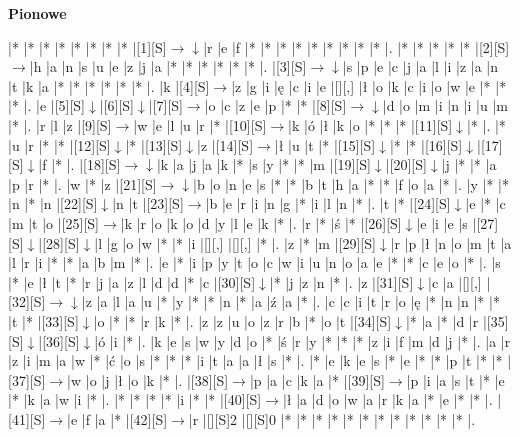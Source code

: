 \documentclass[11pt]{article}
\newcommand\drarr{$\rightarrow \!\!\!\!\! \downarrow$}
\newcommand\rarr{$\rightarrow$}
\newcommand\darr{$\downarrow$}
\begin{document}
\begin{PuzzleClues}{\textbf{Pionowe}\\}
\end{PuzzleClues}\newpage%

\noindent\begin{Puzzle}{20}{23}|*	|*	|*	|*	|*	|*	|*	|*	|[1][S]\drarr	|r	|e	|f	|*	|*	|*	|*	|*	|*	|*	|*	|*	|.
|*	|*	|*	|*	|*	|[2][S]\rarr	|h	|a	|n	|s	|u	|e	|z	|j	|a	|*	|*	|*	|*	|*	|*	|.
|[3][S]\drarr	|s	|p	|e	|c	|j	|a	|l	|i	|z	|a	|n	|t	|k	|a	|*	|*	|*	|*	|*	|*	|.
|k	|[4][S]\rarr	|z	|g	|i	|ę	|c	|i	|e	|[][,]{ }	|ł	|o	|k	|c	|i	|o	|w	|e	|*	|*	|*	|.
|e	|[5][S]\darr	|[6][S]\darr	|[7][S]\rarr	|o	|c	|z	|e	|p	|*	|*	|[8][S]\drarr	|d	|o	|m	|i	|n	|i	|u	|m	|*	|.
|r	|l	|z	|[9][S]\rarr	|w	|e	|l	|u	|r	|*	|[10][S]\rarr	|k	|ó	|ł	|k	|o	|*	|*	|*	|[11][S]\darr	|*	|.
|*	|u	|r	|*	|*	|[12][S]\darr	|*	|[13][S]\darr	|z	|[14][S]\rarr	|ł	|u	|t	|*	|[15][S]\darr	|*	|*	|[16][S]\darr	|[17][S]\darr	|f	|*	|.
|[18][S]\drarr	|k	|a	|j	|a	|k	|*	|s	|y	|*	|*	|m	|[19][S]\darr	|[20][S]\darr	|j	|*	|*	|a	|p	|r	|*	|.
|w	|*	|z	|[21][S]\drarr	|b	|o	|n	|e	|s	|*	|*	|b	|t	|h	|a	|*	|*	|f	|o	|a	|*	|.
|y	|*	|*	|n	|*	|n	|[22][S]\darr	|n	|t	|[23][S]\rarr	|b	|e	|r	|i	|n	|g	|*	|i	|l	|n	|*	|.
|t	|*	|[24][S]\darr	|e	|*	|c	|m	|t	|o	|[25][S]\rarr	|k	|r	|o	|k	|o	|d	|y	|l	|e	|k	|*	|.
|r	|*	|ś	|*	|[26][S]\darr	|e	|i	|e	|s	|[27][S]\darr	|[28][S]\darr	|l	|g	|o	|w	|*	|*	|i	|[][,]{ }	|[][,]{ }	|*	|.
|z	|*	|m	|[29][S]\darr	|r	|p	|ł	|n	|o	|m	|t	|a	|l	|r	|i	|*	|*	|a	|b	|m	|*	|.
|e	|*	|i	|p	|y	|t	|o	|c	|w	|i	|u	|n	|o	|a	|e	|*	|*	|c	|e	|o	|*	|.
|s	|*	|e	|ł	|t	|*	|r	|j	|a	|z	|l	|d	|d	|*	|c	|[30][S]\darr	|*	|j	|z	|n	|*	|.
|z	|[31][S]\darr	|c	|a	|[][,]{ }	|[32][S]\drarr	|z	|a	|l	|a	|u	|*	|y	|*	|*	|n	|*	|a	|ź	|a	|*	|.
|c	|c	|i	|t	|r	|o	|ę	|*	|n	|n	|*	|*	|t	|*	|[33][S]\darr	|o	|*	|*	|r	|k	|*	|.
|z	|z	|u	|o	|z	|r	|b	|*	|o	|t	|[34][S]\darr	|*	|a	|*	|d	|r	|[35][S]\darr	|[36][S]\darr	|ó	|i	|*	|.
|k	|e	|s	|w	|y	|d	|o	|*	|ś	|r	|y	|*	|*	|*	|z	|i	|f	|m	|d	|j	|*	|.
|a	|r	|z	|i	|m	|a	|w	|*	|ć	|o	|s	|*	|*	|*	|i	|t	|a	|a	|ł	|s	|*	|.
|*	|e	|k	|e	|s	|*	|e	|*	|*	|p	|t	|*	|*	|[37][S]\rarr	|w	|o	|j	|ł	|o	|k	|*	|.
|[38][S]\rarr	|p	|a	|c	|k	|a	|*	|[39][S]\rarr	|p	|i	|a	|s	|t	|*	|e	|*	|k	|a	|w	|i	|*	|.
|*	|*	|*	|*	|i	|*	|*	|[40][S]\rarr	|ł	|a	|d	|o	|w	|a	|r	|k	|a	|*	|e	|*	|*	|.
|[41][S]\rarr	|e	|f	|a	|*	|[42][S]\rarr	|r	|[][S]2	|[][S]0	|*	|*	|*	|*	|*	|*	|*	|*	|*	|*	|*	|*	|.\end{Puzzle}
\end{document}
